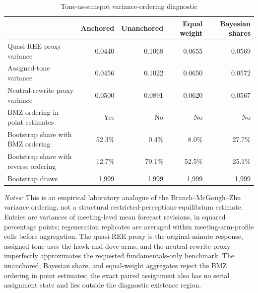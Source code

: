 \begin{table}[htbp]
\color{revisionred}
\centering
\begin{threeparttable}
\caption{Tone-as-sunspot variance-ordering diagnostic}
\label{tab:sunspot-ordering}
\begin{scriptsize}
\setlength{\tabcolsep}{3.6pt}
\begin{tabular}{ldddd}
\toprule
 & Anchored & Unanchored & Equal weight & Bayesian shares \\
\midrule
Quasi-REE proxy variance & 0.0440 & 0.1068 & 0.0655 & 0.0569 \\
Assigned-tone variance & 0.0456 & 0.1022 & 0.0650 & 0.0572 \\
Neutral-rewrite proxy variance & 0.0500 & 0.0891 & 0.0620 & 0.0567 \\
\midrule
BMZ ordering in point estimates & Yes & No & No & No \\
Bootstrap share with BMZ ordering & 52.3\% & 0.4\% & 8.0\% & 27.7\% \\
Bootstrap share with reverse ordering & 12.7\% & 79.1\% & 52.5\% & 25.1\% \\
Bootstrap draws & 1,999 & 1,999 & 1,999 & 1,999 \\
\bottomrule
\end{tabular}
\begin{tablenotes}[flushleft]
\scriptsize
\item \textit{Notes:} This is an empirical laboratory analogue of the Branch--McGough--Zhu variance ordering, not a structural restricted-perceptions-equilibrium estimate. Entries are variances of meeting-level mean forecast revisions, in squared percentage points; regeneration replicates are averaged within meeting-arm-profile cells before aggregation. The quasi-REE proxy is the original-minute response, assigned tone uses the hawk and dove arms, and the neutral-rewrite proxy imperfectly approximates the requested fundamentals-only benchmark. The unanchored, Bayesian share, and equal-weight aggregates reject the BMZ ordering in point estimates; the exact paired assignment also has no serial assignment state and lies outside the diagnostic existence region.
\end{tablenotes}
\end{scriptsize}
\end{threeparttable}
\end{table}
